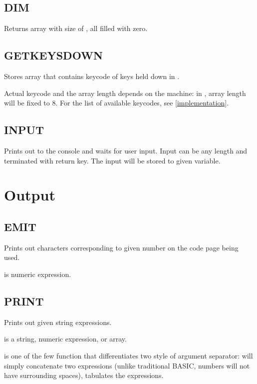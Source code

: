     \subsection{DIM}
        \par
        Returns array with size of , all filled with zero.
    \subsection{GETKEYSDOWN}
        \par
        Stores array that contains keycode of keys held down in .\par
        Actual keycode and the array length depends on the machine: in \thismachine , array length will be fixed to 8. For the list of available keycodes, see \ref{implementation}.
    \subsection{INPUT}
        \par
        Prints out  to the console and waits for user input. Input can be any length and terminated with return key. The input will be stored to given variable.

\section{Output}

    \subsection{EMIT}
        \par
        Prints out characters corresponding to given number on the code page being used.\par
         is numeric expression.
    \subsection{PRINT}
        \par
        Prints out given string expressions.\par
         is a string, numeric expression, or array.\par
         is one of the few function that differentiates two style of argument separator: \codebf{;} will simply concatenate two expressions (unlike traditional BASIC, numbers will not have surrounding spaces), \codebf{,} tabulates the expressions.

